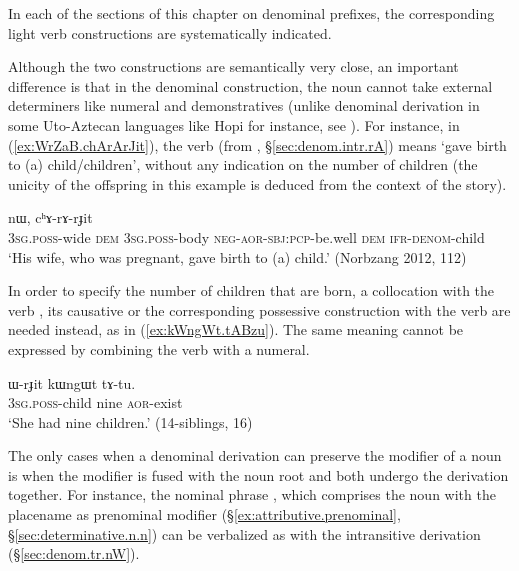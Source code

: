 In each of the sections of this chapter on denominal prefixes, the corresponding light verb constructions are systematically indicated.

Although the two constructions are semantically very close, an important difference is that in the denominal construction, the noun cannot take external determiners like numeral and demonstratives (unlike denominal derivation in some Uto-Aztecan languages like Hopi for instance, see \citealt{hill.kc03hopi}). For instance, in (\ref{ex:WrZaB.chArArJit}), the verb  (from , §\ref{sec:denom.intr.rA}) means  `gave birth to (a) child/children', without any indication on the number of children (the unicity of the offspring in this example is deduced from the context of the story).

\begin{exe}
\ex \label{ex:WrZaB.chArArJit}
 nɯ, cʰɤ-rɤ-rɟit \\
 \textsc{3sg}.\textsc{poss}-wide \textsc{dem} \textsc{3sg}.\textsc{poss}-body \textsc{neg}-\textsc{aor}-\textsc{sbj}:\textsc{pcp}-be.well \textsc{dem} \textsc{ifr}-\textsc{denom}-child \\
\glt `His wife, who was pregnant, gave birth to (a) child.' (Norbzang 2012, 112)
\end{exe}

In order to specify the number of children that are born, a collocation with the verb , its causative  or the corresponding possessive construction with the verb  are needed instead, as in (\ref{ex:kWngWt.tABzu}). The same meaning cannot be expressed by combining the verb  with a numeral.

\begin{exe}
\ex \label{ex:kWngWt.tABzu}
\gll  ɯ-rɟit kɯngɯt tɤ-tu. \\
 \textsc{3sg}.\textsc{poss}-child nine \textsc{aor}-exist \\
\glt `She had nine children.' (14-siblings, 16)
\end{exe}

The only cases when a denominal derivation can preserve the modifier of a noun is when the modifier is fused with the noun root and both undergo the derivation together. For instance, the nominal phrase , which comprises the noun  with the placename   as prenominal modifier (§\ref{ex:attributive.prenominal}, §\ref{sec:determinative.n.n}) can be verbalized as  with the intransitive  derivation (§\ref{sec:denom.tr.nW}).
 
